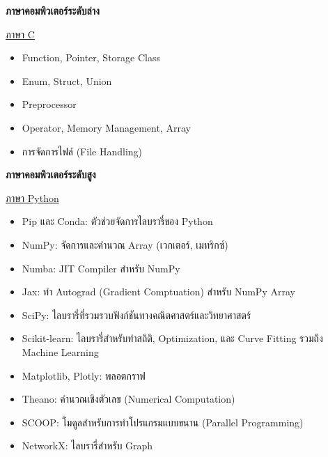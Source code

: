 \noindent \textbf{ภาษาคอมพิวเตอร์ระดับล่าง}

\noindent \underline{ภาษา C}
%
\begin{itemize}[topsep=0pt,noitemsep]
  \setlength\itemsep{0.5em}
  \item Function, Pointer, Storage Class

  \item Enum, Struct, Union

  \item Preprocessor

  \item Operator, Memory Management, Array

  \item การจัดการไฟล์ (File Handling)
\end{itemize}

\noindent \textbf{ภาษาคอมพิวเตอร์ระดับสูง}

\noindent \underline{ภาษา Python}
%
\begin{itemize}[topsep=0pt,noitemsep]
  \item Pip และ Conda: ตัวช่วยจัดการไลบรารี่ของ Python

  \item NumPy: จัดการและคำนวณ Array (เวกเตอร์, เมทริกซ์)

  \item Numba: JIT Compiler สำหรับ NumPy

  \item Jax: ทำ Autograd (Gradient Comptuation) สำหรับ NumPy Array

  \item SciPy: ไลบรารี่ที่รวมรวบฟังก์ชันทางคณิตศาสตร์และวิทยาศาสตร์

  \item Scikit-learn: ไลบรารี่สำหรับทำสถิติ, Optimization, และ Curve Fitting รวมถึง Machine Learning

  \item Matplotlib, Plotly: พลอตกราฟ

  \item Theano: คำนวณเชิงตัวเลข (Numerical Computation)

  \item SCOOP: โมดูลสำหรับการทำโปรแกรมแบบขนาน (Parallel Programming)

  \item NetworkX: ไลบรารี่สำหรับ Graph
\end{itemize}


